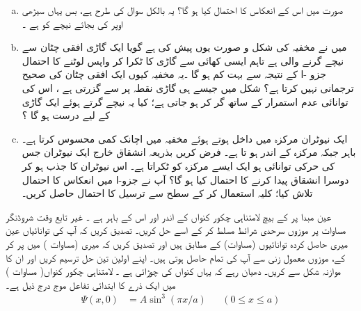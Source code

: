 \begin{enumerate}[a.]
\item
  صورت     میں اس کے  انعکاس کا احتمال کیا ہو گا؟   یہ بالکل سوال   کی طرح ہے،  بس یہاں سیڑھی  اوپر کی  بجائے نیچے کو  ہے ۔
\item 
 میں نے مخفیہ کی  شکل و صورت  یوں  پیش کی ہے گویا  ایک گاڑی  افقی  چٹان سے نیچے گرنے والی ہے تاہم  ایسی کھائی سے  گاڑی کا ٹکرا کر واپس لوٹنے   کا احتمال جزو -ا کے نتیجہ سے بہت کم ہو گا ۔یہ مخفیہ  کیوں ایک افقی  چٹان کی صحیح ترجمانی نہیں کرتا ہے؟    شکل میں جیسے ہی گاڑی نقطہ   پر سے گزرتی ہے ، اس کی توانائی عدم استمرار کے ساتھ گر کر  ہو جاتی ہے؛  کیا   یہ   نیچے  گرتے  ہوئے  ایک گاڑی کے لیے  درست  ہو گا ؟
\item
ایک  نیوٹران مرکزہ  میں داخل ہوتے ہوئے  مخفیہ میں اچانک کمی محسوس کرتا ہے۔ باہر  جبکہ مرکزہ کے اندر  ہو تا ہے۔  فرض کریں  بذریعہ  انشقاق خارج  ایک نیوٹران جس کی حرکی توانائی  ہو ایک ایسے مرکزہ کو ٹکراتا ہے۔ اس نیوٹران کا جذب  ہو کر  دوسرا  انشقاق پیدا کرنے کا احتمال کیا ہو گا؟   آپ نے جزو-ا میں انعکاس کا  احتمال تلاش کیا؛ کلیہ  استعمال کر  کے سطح سے ترسیل کا احتمال حاصل کریں۔
\end{enumerate}
عین مبدا پر   کے بیچ لامتناہی چکور کنواں کے اندر اور اس کے باہر  ہے ۔ غیر  تابع وقت  شروڈنگر مساوات پر موزوں سرحدی شرائط مسلط کر کے اسے حل کریں۔ تصدیق کریں کہ آپ کی توانائیاں عین  میری حاصل کردہ توانائیوں    (مساوات) کے مطابق ہیں     اور تصدیق کریں کہ میری  (مساوات    )  میں     پر کر کے،  موزوں  معمول  زنی   سے آپ کی  تمام  حاصل   ہوتی ہیں۔ اپنے اولین تین حل ترسیم کریں اور ان کا موازنہ شکل  سے کریں۔  دھیان رہے کہ یہاں کنواں کی چوڑائی   ہے ۔ 
 لامتناہی چکور کنواں( مساوات )   میں ایک ذرے کا  ابتدائی تفاعل موج درج ذیل ہے۔
 \begin{align*}
  \Psi(x,0)&=A\sin^{3}(\pi x/a) && (0\le x\le a)
\end{align*}

